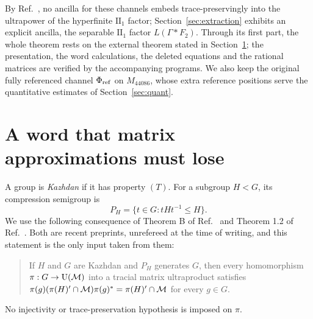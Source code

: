 \documentclass[11pt]{article}
\begin{document}
By Ref.~\cite[Theorem~3.6]{hm15}, no ancilla for these channels embeds trace-preservingly into
the ultrapower of the hyperfinite $\mathrm{II}_1$ factor; Section~\ref{sec:extraction} exhibits an
explicit ancilla, the separable $\mathrm{II}_1$ factor $L(\Gamma*F_2)$. Through its first part,
the whole theorem rests on the external theorem stated in Section~\ref{sec:group}; the
presentation, the
word calculations, the deleted equations and the rational matrices are verified by the
accompanying programs. We also keep the original fully referenced channel $\Phi_{\mathrm{ref}}$ on
$M_{44086}$, whose extra reference positions serve the quantitative estimates of
Section~\ref{sec:quant}.

\section{A word that matrix approximations must lose}\label{sec:group}

A group is \emph{Kazhdan} if it has property $(T)$. For a subgroup $H<G$, its compression
semigroup is
\[
 P_H=\{t\in G:tHt^{-1}\le H\}.
\]
We use the following consequence of Theorem B of Ref.~\cite{alt} and Theorem 1.2 of
Ref.~\cite{thom}. Both are recent preprints, unrefereed at the time of writing, and this
statement is the only input taken from them:
\begin{quote}
If $H$ and $G$ are Kazhdan and $P_H$ generates $G$, then every homomorphism
$\pi:G\to\operatorname{U}(\mathcal M)$ into a tracial matrix ultraproduct satisfies
$\pi(g)(\pi(H)'\cap\mathcal M)\pi(g)^*=\pi(H)'\cap\mathcal M$ for every $g\in G$.
\end{quote}
No injectivity or trace-preservation hypothesis is imposed on $\pi$.
\end{document}
